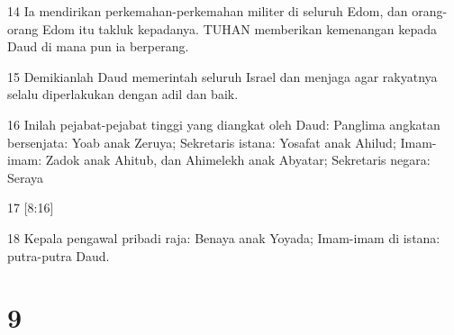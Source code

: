 \par 14 Ia mendirikan perkemahan-perkemahan militer di seluruh Edom, dan orang-orang Edom itu takluk kepadanya. TUHAN memberikan kemenangan kepada Daud di mana pun ia berperang.
\par 15 Demikianlah Daud memerintah seluruh Israel dan menjaga agar rakyatnya selalu diperlakukan dengan adil dan baik.
\par 16 Inilah pejabat-pejabat tinggi yang diangkat oleh Daud: Panglima angkatan bersenjata: Yoab anak Zeruya; Sekretaris istana: Yosafat anak Ahilud; Imam-imam: Zadok anak Ahitub, dan Ahimelekh anak Abyatar; Sekretaris negara: Seraya
\par 17 [8:16]
\par 18 Kepala pengawal pribadi raja: Benaya anak Yoyada; Imam-imam di istana: putra-putra Daud.

\chapter{9}


